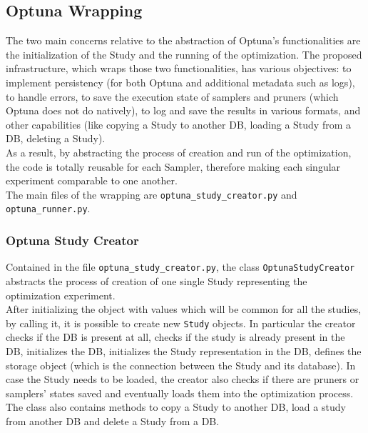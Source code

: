 \subsection{Optuna Wrapping}

The two main concerns relative to the abstraction of Optuna's functionalities are the initialization of the Study and the running of the optimization.
The proposed infrastructure, which wraps those two functionalities, has various objectives: to implement persistency (for both Optuna and additional metadata such as logs), to handle errors, to save the execution state of samplers and pruners (which Optuna does not do natively), to log and save the results in various formats, and other capabilities (like copying a Study to another DB, loading a Study from a DB, deleting a Study).
\\[0.3cm]As a result, by abstracting the process of creation and run of the optimization, the code is totally reusable for each Sampler, therefore making each singular experiment comparable to one another.
\\[0.3cm]The main files of the wrapping are \texttt{optuna\_study\_creator.py} and \texttt{optuna\_runner.py}.

\subsubsection{Optuna Study Creator}

Contained in the file \texttt{optuna\_study\_creator.py}, the class \texttt{OptunaStudyCreator} abstracts the process of creation of one single Study representing the optimization experiment.
% 
\\[0.3cm]After initializing the object with values which will be common for all the studies, by calling it, it is possible to create new \texttt{Study} objects.
In particular the creator checks if the DB is present at all, checks if the study is already present in the DB, initializes the DB, initializes the Study representation in the DB, defines the storage object (which is the connection between the Study and its database).
In case the Study needs to be loaded, the creator also checks if there are pruners or samplers' states saved and eventually loads them into the optimization process.
% 
\\[0.3cm]The class also contains methods to copy a Study to another DB, load a study from another DB and delete a Study from a DB.

